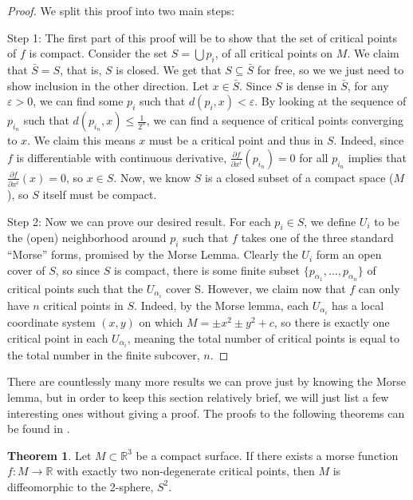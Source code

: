 \documentclass[12pt]{article}
\newcommand{\bR}{{\mathbb R}}
\theoremstyle{definition}
\newtheorem{theorem}{Theorem}
\begin{document}
\begin{proof}
	We split this proof into two main steps: 

	Step 1:
    The first part of this proof will be to show that the set of critical points of $f$ is compact. Consider the set $S = \bigcup p_i$, of all critical points on $M$. We claim that $\bar{S} = S$, that is, $S$ is closed. We get that $S\subseteq \bar{S}$ for free, so we we just need to show inclusion in the other direction. Let $x \in \bar{S}$. Since $S$ is dense in $\bar{S}$, for any $\varepsilon > 0$, we can find some $p_i$ such that $d(p_i,x)<\varepsilon$. By looking at the sequence of $p_{i_n}$ such that $d(p_{i_n},x)\leq \frac{1}{2^n}$, we can find a sequence of critical points converging to $x$. We claim this means $x$ must be a critical point and thus in $S$. Indeed, since $f$ is differentiable with continuous derivative, $\frac{\partial f}{\partial x^i}(p_{i_n}) = 0$ for all $p_{i_n}$ implies that $\frac{\partial f}{\partial x^i}(x) = 0$, so $x \in S$. Now, we know $S$ is a closed subset of a compact space ($M$), so $S$ itself must be compact. 
	
	Step 2:
	Now we can prove our desired result. For each $p_i \in S$, we define $U_i$ to be the (open) neighborhood around $p_i$ such that $f$ takes one of the three standard ``Morse'' forms, promised by the Morse Lemma. Clearly the $U_i$ form an open cover of $S$, so since $S$ is compact, there is some finite subset $\{p_{\alpha_1}, ... ,p_{\alpha_n}\}$ of critical points such that the $U_{\alpha_i}$ cover S. However, we claim now that $f$ can only have $n$ critical points in $S$. Indeed, by the Morse lemma, each $U_{\alpha_i}$ has a local coordinate system $(x,y)$ on which $M = \pm x^2 \pm y^2 +c$, so there is exactly one critical point in each $U_{\alpha_i}$, meaning the total number of critical points is equal to the total number in the finite subcover, $n$.
\end{proof}
\noindent
There are countlessly many more results we can prove just by knowing the Morse lemma, but in order to keep this section relatively brief, we will just list a few interesting ones without giving a proof. The proofs to the following theorems can be found in \cite{Matsumoto13}. 

\begin{theorem}
	Let $M\subset \bR^3$ be a compact surface. If there exists a morse function $f:M\rightarrow \bR$ with exactly two non-degenerate critical points, then $M$ is diffeomorphic to the 2-sphere, $S^2$. 
\end{theorem}
\end{document}
